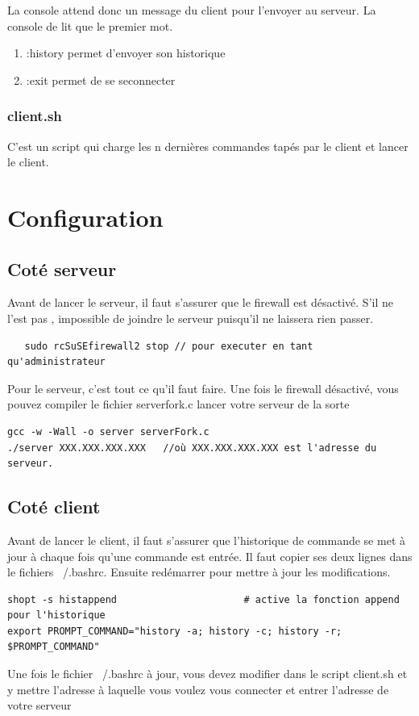 \documentclass[a4paper,11pt]{report}
\begin{document}
La console attend donc un message du client pour l'envoyer au serveur. La console de lit que le premier mot.
\begin{enumerate}
  \item :history permet d'envoyer son historique
  \item :exit permet de se seconnecter
\end{enumerate}

\subsection{client.sh}

C'est un script qui charge les n dernières commandes tapés par le client et lancer le client. 


\chapter{Configuration}

\section{Coté serveur}
Avant de lancer le serveur, il faut s'assurer que le firewall est désactivé. S'il ne l'est pas , impossible de joindre le serveur puisqu'il ne laissera rien passer.
\begin{lstlisting} 
   sudo rcSuSEfirewall2 stop // pour executer en tant qu'administrateur
\end{lstlisting}
Pour le serveur, c'est tout ce qu'il faut faire.
Une fois le firewall désactivé, vous pouvez compiler le fichier serverfork.c lancer votre serveur de la sorte 
\begin{lstlisting} 
gcc -w -Wall -o server serverFork.c
./server XXX.XXX.XXX.XXX   //où XXX.XXX.XXX.XXX est l'adresse du serveur.
\end{lstlisting}




\section{Coté client}
Avant de lancer le client, il faut s'assurer que l'historique de commande se met à jour à chaque fois qu'une commande est entrée. Il faut copier ses deux lignes dans le fichiers ~/.bashrc. Ensuite redémarrer pour mettre à jour les modifications.
\begin{lstlisting} 
shopt -s histappend                      # active la fonction append pour l'historique
export PROMPT_COMMAND="history -a; history -c; history -r; $PROMPT_COMMAND"
\end{lstlisting}
Une fois le fichier ~/.bashrc à jour, vous devez modifier dans le script client.sh et y mettre l'adresse à laquelle vous voulez vous connecter et entrer l'adresse de votre serveur 
\end{document}
